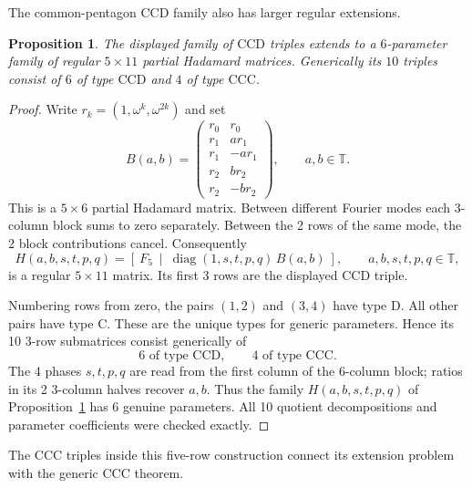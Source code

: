 \documentclass[11pt,a4paper]{article}
\newtheorem{proposition}[theorem]{Proposition}
\theoremstyle{plain}
\theoremstyle{definition}
\theoremstyle{plain}
\begin{document}
\medskip
The common-pentagon $\mathrm{CCD}$ family also has larger regular extensions.

\par\addvspace{\medskipamount}\noindent
\begin{minipage}{\linewidth}
\begin{proposition}\label{n11_mixed:fiveconstruction}
The displayed family of $\mathrm{CCD}$ triples extends to a $6$-parameter family of regular $5\times11$ partial Hadamard matrices. Generically its $10$ triples consist of $6$ of type $\mathrm{CCD}$ and $4$ of type $\mathrm{CCC}$.
\end{proposition}
\end{minipage}
\par\addvspace{\medskipamount}

\begin{proof}
Write $r_k=(1,\omega^k,\omega^{2k})$ and set
$$B(a,b)=
\begin{pmatrix}
r_0&r_0\\
r_1&a r_1\\
r_1&-a r_1\\
r_2&b r_2\\
r_2&-b r_2
\end{pmatrix},
\qquad a,b\in\mathbb{T}.$$
This is a $5\times6$ partial Hadamard matrix. Between different Fourier modes each 3-column block sums to zero separately. Between the 2 rows of the same mode, the 2 block contributions cancel. Consequently
\[
H(a,b,s,t,p,q)= \left[\ F_5\ \middle|\ \operatorname{diag}(1,s,t,p,q)\,B(a,b)\ \right], \qquad a,b,s,t,p,q\in\mathbb{T},
\]
is a regular $5\times11$ matrix. Its first 3 rows are the displayed $\mathrm{CCD}$ triple.

Numbering rows from zero, the pairs $(1,2)$ and $(3,4)$ have type $\mathrm{D}$. All other pairs have type $\mathrm{C}$. These are the unique types for generic parameters. Hence its 10 3-row submatrices consist generically of
$$6\text{ of type }\mathrm{CCD},\qquad 4\text{ of type }\mathrm{CCC}.$$
The 4 phases $s,t,p,q$ are read from the first column of the 6-column block; ratios in its 2 3-column halves recover $a,b$. Thus the family $H(a,b,s,t,p,q)$ of Proposition~\ref{n11_mixed:fiveconstruction} has 6 genuine parameters. All 10 quotient decompositions and parameter coefficients were checked exactly.
\end{proof} 

The $\mathrm{CCC}$ triples inside this five-row construction connect its extension problem with the generic $\mathrm{CCC}$ theorem.
\end{document}
